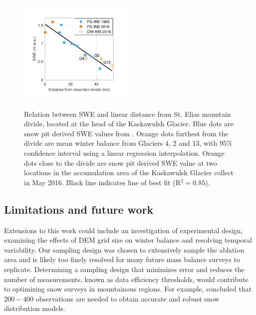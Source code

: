 \documentclass[twocolumn, letterpaper]{igs}
\begin{document}
\begin{figure}
	\centering
	\includegraphics[width =0.5\textwidth]{AccumGrad.pdf}\\
	\caption{Relation between SWE and linear distance from St. Elias mountain divide, located at the head of the Kaskawulsh Glacier. Blue dots are snow pit derived SWE values from \cite{Taylor1969}. Orange dots furthest from the divide are mean winter balance from Glaciers 4, 2 and 13, with 95\% confidence interval using a linear regression interpolation. Orange dots close to the divide are snow pit derived SWE value at two locations in the accumulation area of the Kaskawulsh Glacier collect in May 2016. Black line indicates line of best fit (R$^2=0.85$).}
	\label{fig:AccumGrad}
\end{figure}


\subsection{Limitations and future work}

Extensions to this work could include an investigation of experimental design, examining the effects of DEM grid size on winter balance and resolving temporal variability. Our sampling design was chosen to extensively sample the ablation area and is likely too finely resolved for many future mass balance surveys to replicate. Determining a sampling design that minimizes error and reduces the number of measurements, known as data efficiency thresholds, would contribute to optimizing snow surveys in mountainous regions. For example, \cite{Lopez2010} concluded that $200-400$ observations are needed to obtain accurate and robust snow distribution models. 
\end{document}
